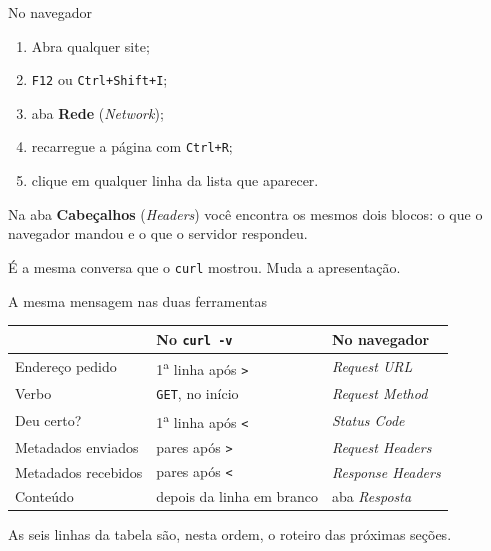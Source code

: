 \documentclass{beamer}
\begin{document}
\begin{frame}{No navegador}
  \begin{enumerate}
    \item Abra qualquer site;
    \item \texttt{F12} ou \texttt{Ctrl+Shift+I};
    \item aba \textbf{Rede} (\textit{Network});
    \item recarregue a página com \texttt{Ctrl+R};
    \item clique em qualquer linha da lista que aparecer.
  \end{enumerate}

  \vspace{0.4cm}
  Na aba \textbf{Cabeçalhos} (\textit{Headers}) você encontra os mesmos dois
  blocos: o que o navegador mandou e o que o servidor respondeu.

  \vspace{0.3cm}
  \begin{block}{}
    É a mesma conversa que o \texttt{curl} mostrou. Muda a apresentação.
  \end{block}
\end{frame}

\begin{frame}{A mesma mensagem nas duas ferramentas}
  \begin{center}
    \small
    \begin{tabular}{@{}lll@{}}
      \toprule
      & \textbf{No \texttt{curl -v}} & \textbf{No navegador} \\
      \midrule
      Endereço pedido    & 1\textsuperscript{a} linha após \texttt{>} & \textit{Request URL} \\
      Verbo              & \texttt{GET}, no início    & \textit{Request Method} \\
      Deu certo?         & 1\textsuperscript{a} linha após \texttt{<} & \textit{Status Code} \\
      Metadados enviados & pares após \texttt{>}      & \textit{Request Headers} \\
      Metadados recebidos& pares após \texttt{<}      & \textit{Response Headers} \\
      Conteúdo           & depois da linha em branco  & aba \textit{Resposta} \\
      \bottomrule
    \end{tabular}
  \end{center}

  \vspace{0.4cm}
  As seis linhas da tabela são, nesta ordem, o roteiro das próximas seções.
\end{frame}
\end{document}
